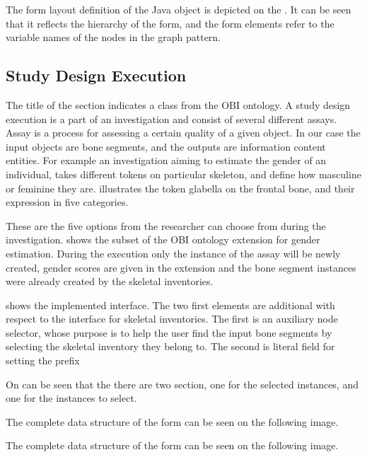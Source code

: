 
The form layout definition of the Java object is depicted on the . It can be seen that it reflects the hierarchy of the form, and the form elements refer to the variable names of the nodes in the graph pattern.


\subsection{Study Design Execution} \label{43}

The title of the section indicates a class from the OBI ontology. A study design execution is a part of an investigation and consist of several different assays. Assay is a process for assessing a certain quality of a given object. In our case the input objects are bone segments, and the outputs are information content entities. For example an investigation aiming to estimate the gender of an individual, takes different tokens on particular skeleton, and define how masculine or feminine they are.  illustrates the token glabella on the frontal bone, and their expression in five categories.


These are the five options from the researcher can choose from during the investigation.  shows the subset of the OBI ontology extension for gender estimation. During the execution only the instance of the assay will be newly created, gender scores are given in the extension and the bone segment instances were already created by the skeletal inventories.


 shows the implemented interface. The two first elements are additional with respect to the interface for skeletal inventories. The first is an auxiliary node selector, whose purpose is to help the user find the input bone segments by selecting the skeletal inventory they belong to. The second is literal field for setting the prefix 



On  can be seen that the there are two section, one for the selected instances, and one for the instances to select. 


The complete data structure of the form can be seen on the following image.


The complete data structure of the form can be seen on the following image.



